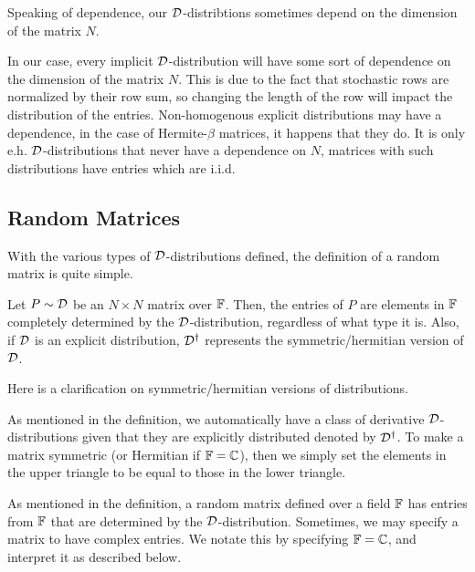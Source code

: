 Speaking of dependence, our $\mathcal{D}$-distribtions sometimes depend on the dimension of the matrix $N$.

\begin{remark}[Dependence on $N$]
In our case, every implicit $\mathcal{D}$-distribution will have some sort of dependence on the dimension of the matrix $N$.
This is due to the fact that stochastic rows are normalized by their row sum, so changing the length of the row will impact the distribution of the entries.
Non-homogenous explicit distributions may have a dependence, in the case of Hermite-$\beta$ matrices, it happens that they do.
It is only e.h. $\mathcal{D}$-distributions that never have a dependence on $N$, matrices with such distributions have entries which are i.i.d.
\end{remark}

\newpage
\subsection{Random Matrices}

With the various types of $\mathcal{D}$-distributions defined, the definition of a random matrix is quite simple.

\begin{definition}
Let $P \sim \mathcal{D}$ be an $N \times N$ matrix over $\mathbb{F}$. Then, the entries of $P$ are elements in $\mathbb{F}$ completely determined by the $\mathcal{D}$-distribution, regardless of what type it is.
Also, if $\mathcal{D}$ is an explicit distribution, $\mathcal{D}^\dagger$ represents the symmetric/hermitian version of $\mathcal{D}$.
\end{definition}

Here is a clarification on symmetric/hermitian versions of distributions.

\begin{remark}
As mentioned in the definition, we automatically have a class of derivative $\mathcal{D}$-distributions given that they are explicitly distributed denoted by $\mathcal{D}^\dagger$. To make a matrix symmetric
(or Hermitian if $\mathbb{F} = \mathbb{C}$), then we simply set the elements in the upper triangle to be equal to those in the lower triangle.
\end{remark}

As mentioned in the definition, a random matrix defined over a field $\mathbb{F}$ has entries from $\mathbb{F}$ that are determined by the $\mathcal{D}$-distribution.
Sometimes, we may specify a matrix to have complex entries. We notate this by specifying $\mathbb{F} = \mathbb{C}$, and interpret it as described below.

